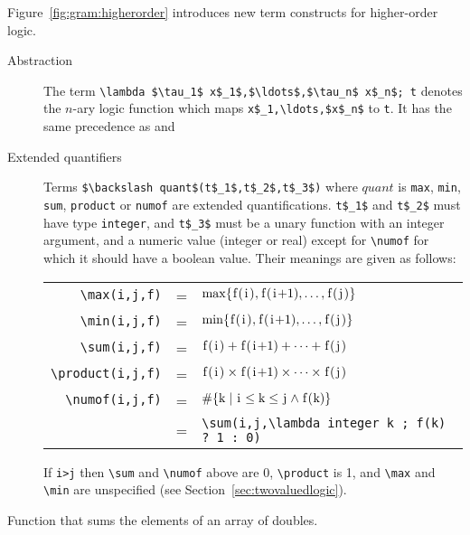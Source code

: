 Figure~\ref{fig:gram:higherorder} introduces new term constructs for
higher-order logic.
\begin{description}
\item[Abstraction]
  The term \lstinline|\lambda $\tau_1$ x$_1$,$\ldots$,$\tau_n$ x$_n$; t|
  denotes the $n$-ary logic function which maps \lstinline|x$_1,\ldots,$x$_n$| to
  \lstinline|t|. It has the same precedence as \Forall and \Exists
\item[Extended quantifiers]
  Terms
 \lstinline|$\backslash quant$(t$_1$,t$_2$,t$_3$)|
  where $quant$ is \lstinline|max|,
  \lstinline|min|,
  \lstinline|sum|,
  \lstinline|product|
  or \lstinline|numof|
  are extended quantifications. \lstinline|t$_1$| and \lstinline|t$_2$| must have type
  \lstinline|integer|, and \lstinline|t$_3$| must be a unary function with an integer
  argument, and a numeric value (integer or real) except for
  \lstinline|\numof| for which it should have a boolean value. Their
  meanings are given as follows:
  \begin{tabular}{rcl}
    \lstinline|\max(i,j,f)| &=&
    $\max \{ \lstinline|f(i)|,\lstinline|f(i+1)|, \ldots, \lstinline|f(j)| \}$\\
    \lstinline|\min(i,j,f)| &=&
    $\min \{ \lstinline|f(i)|,\lstinline|f(i+1)|, \ldots, \lstinline|f(j)| \}$\\
    \lstinline|\sum(i,j,f)| &=&
    $\lstinline|f(i)|+\lstinline|f(i+1)|+\cdots+\lstinline|f(j)|$ \\
    \lstinline|\product(i,j,f)| &=&
    $\lstinline|f(i)|\times\lstinline|f(i+1)|\times\cdots\times\lstinline|f(j)|$
    \\
    \lstinline|\numof(i,j,f)| &=&
    $\#\{ \lstinline|k| \mid \lstinline|i| \leq \lstinline|k| \leq
          \lstinline|j| \land \lstinline|f(k)| \}$ \\
&=& \lstinline|\sum(i,j,\lambda integer k ; f(k) ? 1 : 0)|
  \end{tabular}

  If \lstinline|i>j| then \lstinline|\sum| and \lstinline|\numof| above are 0,
  \lstinline|\product| is 1, and \lstinline|\max| and \lstinline|\min| are
  unspecified (see Section~\ref{sec:twovaluedlogic}).
\end{description}


\begin{example}
  \label{ex:higherorder}
  Function that sums the elements of an array of doubles.
\end{example}

